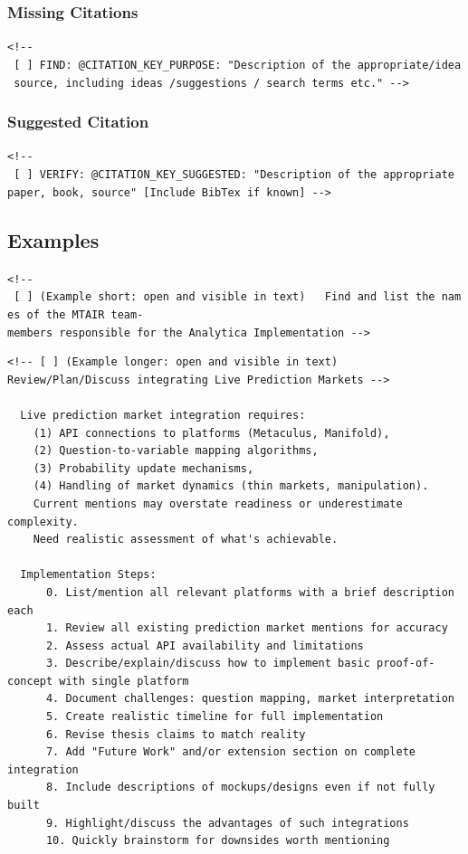 \documentclass[
  11pt,
  letterpaper,
]{book}
\begin{document}
\subsubsection{Missing Citations}\label{missing-citations-1}

\texttt{\textless{}!-\/-\ {[}\ {]}\ FIND:\ @CITATION\_KEY\_PURPOSE:\ "Description\ of\ the\ appropriate/idea\ source,\ including\ ideas\ /suggestions\ /\ search\ terms\ etc."\ -\/-\textgreater{}}

\subsubsection{Suggested Citation}\label{suggested-citation-1}

\texttt{\textless{}!-\/-\ {[}\ {]}\ VERIFY:\ @CITATION\_KEY\_SUGGESTED:\ "Description\ of\ the\ appropriate\ paper,\ book,\ source"\ {[}Include\ BibTex\ if\ known{]}\ -\/-\textgreater{}}

\subsection{Examples}\label{examples}

\texttt{\textless{}!-\/-\ {[}\ {]}\ (Example\ short:\ open\ and\ visible\ in\ text)\ \ \ Find\ and\ list\ the\ names\ of\ the\ MTAIR\ team-members\ responsible\ for\ the\ Analytica\ Implementation\ -\/-\textgreater{}}

\begin{verbatim}
<!-- [ ] (Example longer: open and visible in text)    Review/Plan/Discuss integrating Live Prediction Markets -->

  Live prediction market integration requires:
    (1) API connections to platforms (Metaculus, Manifold),
    (2) Question-to-variable mapping algorithms,
    (3) Probability update mechanisms, 
    (4) Handling of market dynamics (thin markets, manipulation).
    Current mentions may overstate readiness or underestimate complexity.
    Need realistic assessment of what's achievable.

  Implementation Steps:
      0. List/mention all relevant platforms with a brief description each
      1. Review all existing prediction market mentions for accuracy
      2. Assess actual API availability and limitations
      3. Describe/explain/discuss how to implement basic proof-of-concept with single platform
      4. Document challenges: question mapping, market interpretation
      5. Create realistic timeline for full implementation
      6. Revise thesis claims to match reality
      7. Add "Future Work" and/or extension section on complete integration
      8. Include descriptions of mockups/designs even if not fully built 
      9. Highlight/discuss the advantages of such integrations
      10. Quickly brainstorm for downsides worth mentioning
\end{verbatim}
\end{document}

